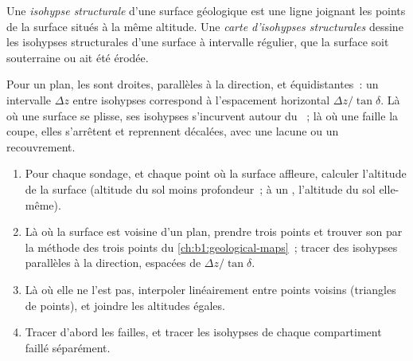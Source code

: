 \begin{definition}\label{def:b1:cross-sections:structure-contour}
Une \emph{isohypse structurale} d'une surface géologique est une ligne joignant les
points de la surface situés à la même altitude. Une \emph{carte d'isohypses
structurales} dessine les isohypses structurales d'une surface à intervalle
régulier, que la surface soit souterraine ou ait été érodée.
\end{definition}

Pour un plan, les  sont droites, parallèles à la
direction, et équidistantes~: un intervalle $\Delta z$ entre isohypses
correspond à l'espacement horizontal $\Delta z/\tan\delta$. Là où une surface se
plisse, ses isohypses s'incurvent autour du ~; là où une faille la coupe,
elles s'arrêtent et reprennent décalées, avec une lacune ou un recouvrement.

\begin{method}\label{met:b1:cross-sections:structure-contours}
\begin{enumerate}
  \item Pour chaque sondage, et chaque point où la surface affleure, calculer
        l'altitude de la surface (altitude du sol moins profondeur~; à un
        , l'altitude du sol elle-même).
  \item Là où la surface est voisine d'un plan, prendre trois points et trouver
        son  par la méthode des trois points du
        \cref{ch:b1:geological-maps}~; tracer des isohypses parallèles à la
        direction, espacées de $\Delta z/\tan\delta$.
  \item Là où elle ne l'est pas, interpoler linéairement entre points voisins
        (triangles de points), et joindre les altitudes égales.
  \item Tracer d'abord les failles, et tracer les isohypses de chaque
        compartiment faillé séparément.
\end{enumerate}
\end{method}

